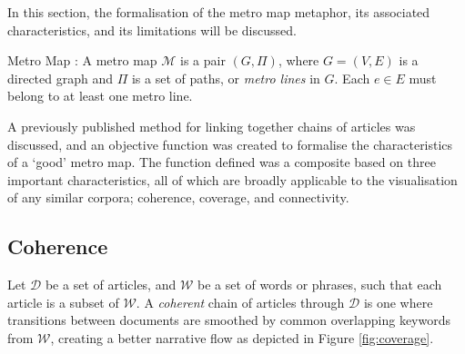 In this section, the formalisation of the metro map metaphor, its associated characteristics, and its limitations will be discussed.

\begin{definition}{Metro Map \citep{GeneratingInformationMaps}:}
A metro map $\mathcal{M}$ is a pair $(G, \Pi)$, where $G=(V, E)$ is a directed graph and $\Pi$ is a set of paths, or \textit{metro lines} in $G$. Each $e \in E$ must belong to at least one metro line.
\label{def:mm}
\end{definition}

A previously published method \citep{ConnectingTheDots} for linking together chains of articles  was discussed, and an objective function was created to formalise the characteristics of a `good' metro map. The function defined was a composite based on three important characteristics, all of which are broadly applicable to the visualisation of any similar corpora; coherence, coverage, and connectivity.

\subsection{Coherence}
Let $\mathcal{D}$ be a set of articles, and $\mathcal{W}$ be a set of words or phrases, such that each article is a subset of $\mathcal{W}$. A \textit{coherent} chain of articles through $\mathcal{D}$ is one where transitions between documents are smoothed by common overlapping keywords from $\mathcal{W}$, creating a better narrative flow \citep{ConnectingTheDots} as depicted in Figure \ref{fig:coverage}.

